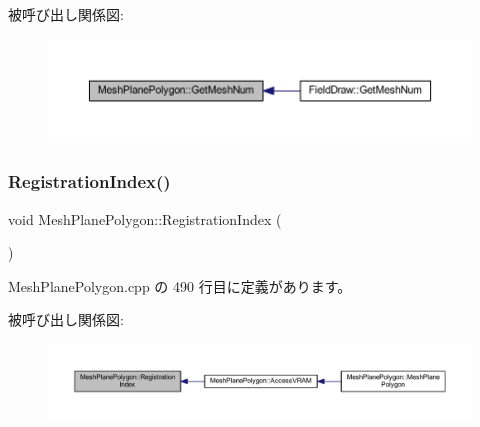 被呼び出し関係図\+:\nopagebreak
\begin{figure}[H]
\begin{center}
\leavevmode
\includegraphics[width=350pt]{class_mesh_plane_polygon_a42d1d92dea7878cf59d418aa7ab5106d_icgraph}
\end{center}
\end{figure}
\mbox{\label{class_mesh_plane_polygon_aab346c974196e257399095dd914aaa51}} 
\subsubsection{\texorpdfstring{Registration\+Index()}{RegistrationIndex()}}
{\footnotesize\ttfamily void Mesh\+Plane\+Polygon\+::\+Registration\+Index (\begin{DoxyParamCaption}{ }\end{DoxyParamCaption})\hspace{0.3cm}{\ttfamily [private]}}



 Mesh\+Plane\+Polygon.\+cpp の 490 行目に定義があります。

被呼び出し関係図\+:\nopagebreak
\begin{figure}[H]
\begin{center}
\leavevmode
\includegraphics[width=350pt]{class_mesh_plane_polygon_aab346c974196e257399095dd914aaa51_icgraph}
\end{center}
\end{figure}
\mbox{\label{class_mesh_plane_polygon_ae3c43c5641c962ac848b3dadd3ea15e5}} 
